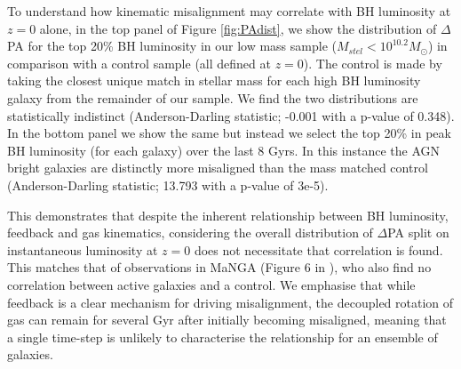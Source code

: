 \documentclass[fleqn,usenatbib]{mnras}
\begin{document}

To understand how kinematic misalignment may correlate with BH luminosity at $z=0$ alone, in the top panel of Figure \ref{fig:PAdist}, we show the distribution of $\Delta$PA for the top 20\% BH luminosity in our low mass sample ($M_{stel} < 10^{10.2}M_{\odot}$) in comparison with a control sample (all defined at $z=0$). The control is made by taking the closest unique match in stellar mass for each high BH luminosity galaxy from the remainder of our sample. We find the two distributions are statistically indistinct (Anderson-Darling statistic; -0.001 with a p-value of 0.348). In the bottom panel we show the same but instead we select the top 20\% in peak BH luminosity (for each galaxy) over the last 8 Gyrs. In this instance the AGN bright galaxies are distinctly more misaligned than the mass matched control (Anderson-Darling statistic; 13.793 with a p-value of 3e-5). 

This demonstrates that despite the inherent relationship between BH luminosity, feedback and gas kinematics, considering the overall distribution of $\Delta$PA split on instantaneous luminosity at $z=0$ does not necessitate that correlation is found. This matches that of observations in MaNGA (Figure 6 in \citet[][]{ilha2019}), who also find no correlation between active galaxies and a control. We emphasise that while feedback is a clear mechanism for driving misalignment, the decoupled rotation of gas can remain for several Gyr after initially becoming misaligned, meaning that a single time-step is unlikely to characterise the relationship for an ensemble of galaxies. 
\end{document}
